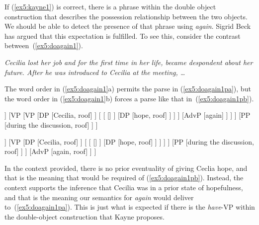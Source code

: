 If (\ref{ex5:kayne1}) is correct, there is a phrase within the double object construction that describes the possession relationship between the two objects. We should be able to detect the presence of that phrase using \emph{again}. Sigrid Beck\cite{Beck:2004} has argued that this expectation is fulfilled. To see this, consider the contrast between~(\ref{ex5:doagain1}).
\begin{exe}
	\raggedright
	\ex \emph{Cecilia lost her job and for the first time in her life, became despondent about her future. After he was introduced to Cecilia at the meeting, \ldots}
	\ex \label{ex5:doagain1} 
	\begin{xlist}
	\end{xlist}
\end{exe}
The word order in (\ref{ex5:doagain1}a) permits the parse in (\ref{ex5:doagain1pa}), but the word order in (\ref{ex5:doagain1}b) forces a parse like that in~(\ref{ex5:doagain1pb}).
\begin{exe}
	\raggedright
	\ex \label{ex5:doagain1pa} 
	\small
	\begin{forest}
	[\ibar{V}
		[\ibar{V} 
			[\obar{V} [$\surd$give] ]
			[VP
				[VP 
					[DP [Cecilia, roof] ]
					[
						[ [] ]
						[DP [hope, roof] ]
					 ]
				 ]
				[AdvP [again] ]
			 ]
		]
		[PP [during the discussion, roof] ]
	]
	\end{forest}
	\ex \label{ex5:doagain1pb}
	\begin{forest}
	[\ibar{V}
		[\ibar{V} 
			[\obar{V} 
				[\obar{V} [$\surd$give] ]
				[VP
					[DP [Cecilia, roof] ]
					[
						[ [] ]
						[DP [hope, roof] ]
					 ]
				 ]
			 ]
			[PP [during the discussion, roof] ]
		]
		[AdvP [again, roof] ]
	]
	\end{forest}
\end{exe}
In the context provided, there is no prior eventuality of giving Ceclia hope, and that is the meaning that would be required of (\ref{ex5:doagain1pb}). Instead, the context supports the inference that Cecilia was in a prior state of hopefulness, and that is the meaning our semantics for \emph{again} would deliver to~(\ref{ex5:doagain1pa}). This is just what is expected if there is the \emph{have}-VP within the double-object construction that Kayne proposes.

